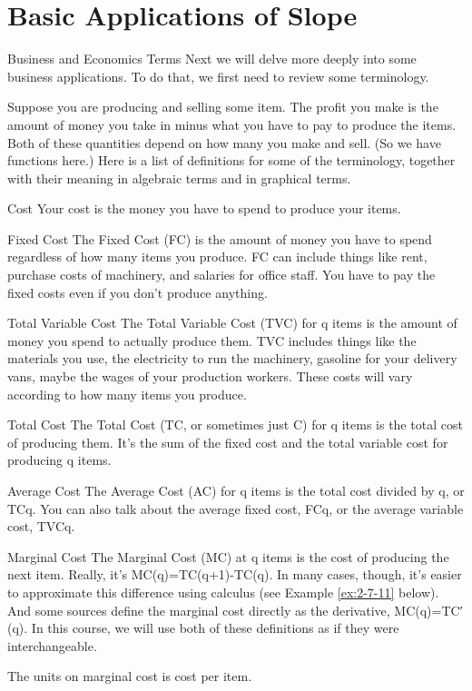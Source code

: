 \section{Basic Applications of Slope}
\label{sec:basic-apps}

Business and Economics Terms
Next we will delve more deeply into some business applications. To do that, we first need to review some terminology.

Suppose you are producing and selling some item. The profit you make is the amount of money you take in minus what you have to pay to produce the items. Both of these quantities depend on how many you make and sell. (So we have functions here.) Here is a list of definitions for some of the terminology, together with their meaning in algebraic terms and in graphical terms.

Cost
Your cost is the money you have to spend to produce your items.

Fixed Cost
The Fixed Cost (FC) is the amount of money you have to spend regardless of how many items you produce. FC can include things like rent, purchase costs of machinery, and salaries for office staff. You have to pay the fixed costs even if you don’t produce anything.

Total Variable Cost
The Total Variable Cost (TVC) for q items is the amount of money you spend to actually produce them. TVC includes things like the materials you use, the electricity to run the machinery, gasoline for your delivery vans, maybe the wages of your production workers. These costs will vary according to how many items you produce.

Total Cost
The Total Cost (TC, or sometimes just C) for q items is the total cost of producing them. It’s the sum of the fixed cost and the total variable cost for producing q items.

Average Cost
The Average Cost (AC) for q items is the total cost divided by q, or TCq. You can also talk about the average fixed cost, FCq, or the average variable cost, TVCq.

Marginal Cost
The Marginal Cost (MC) at q items is the cost of producing the next item. Really, it’s
MC(q)=TC(q+1)-TC(q).
In many cases, though, it’s easier to approximate this difference using calculus (see Example \ref{ex:2-7-11} below). And some sources define the marginal cost directly as the derivative,
MC(q)=TC′(q).
In this course, we will use both of these definitions as if they were interchangeable.

The units on marginal cost is cost per item.

